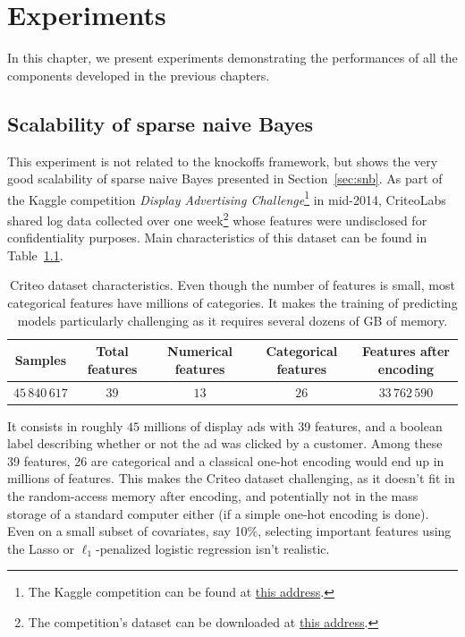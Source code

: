 \chapter{Experiments}\label{ch:exp}

In this chapter,
we present experiments demonstrating the performances of all the components developed in the previous chapters.

\section{Scalability of sparse naive Bayes}\label{sec:snb_criteo}

This experiment is not related to the knockoffs framework,
but shows the very good scalability of sparse naive Bayes
presented in Section~\ref{sec:snb}.
As part of the Kaggle competition \emph{Display Advertising Challenge}\footnote{
    The Kaggle competition can be found at
    \href{https://www.kaggle.com/c/criteo-display-ad-challenge}{this address}.
}
in mid-2014, CriteoLabs shared log data collected over one week\footnote{
    The competition's dataset can be downloaded at
    \href{https://labs.criteo.com/2014/02/download-kaggle-display-advertising-challenge-dataset/}{this address}.
}
whose features were undisclosed for confidentiality purposes.
Main characteristics of this dataset can be found in Table~\ref{tab:criteo_dataset}.
\begin{table}[!htb]
    \centering
    \setlength{\tabcolsep}{2pt}
    {\small
        \begin{tabular}{|c|c|c|c|c|}\hline
        \textbf{Samples} & \textbf{Total features} & \textbf{Numerical features} & \textbf{Categorical features} & \textbf{Features after encoding}\\ \hline
        $45\,840\,617$ & $39$  & $13$ & $26$ & $33\,762\,590$ \\ \hline
        \end{tabular}
    }%
    \caption[short]{
        Criteo dataset characteristics.
        Even though the number of features is small,
        most categorical features have millions of categories.
        It makes the training of predicting models particularly challenging as it requires several
        dozens of GB of memory.
    }
    \label{tab:criteo_dataset}
\end{table}
It consists in roughly $45$ millions of display ads with 39 features,
and a boolean label describing whether or not the ad was clicked by a customer.
Among these 39 features, 26 are categorical and a classical one-hot encoding would end up in millions of features.
This makes the Criteo dataset challenging, as it doesn't fit in the random-access memory after encoding,
and potentially not in the mass storage of a standard computer either (if a simple one-hot encoding is done).
Even on a small subset of covariates, say 10\%,
selecting important features using the Lasso or $\ell_1$-penalized logistic regression isn't realistic.

